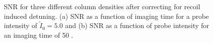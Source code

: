 \documentclass[12pt]{iopart}
\begin{document}
\begin{figure}
\caption{SNR for three different column densities after correcting for recoil induced detuning. (a) SNR as a function of imaging time for a probe intensity of $\tilde{I}_0=5.0$ and (b) SNR as a function of probe intensity for an imaging time of 50 \us{}.}
\label{fig:SNR}
\end{figure}
\end{document}
